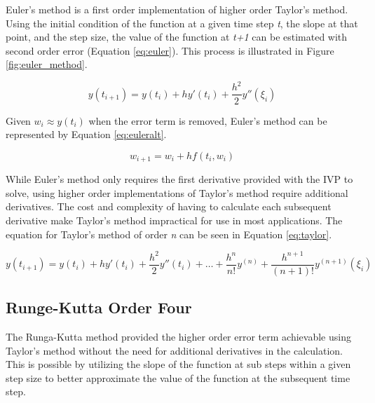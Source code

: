 \documentclass{article}
\begin{document}
Euler's method is a first order implementation of higher order Taylor's method. Using the initial condition of the function at a given time step \textit{t}, the slope at that point, and the step size, the value of the function at \textit{t+1} can be estimated with second order error (Equation \ref{eq:euler}). This process is illustrated in Figure \ref{fig:euler_method}.

\begin{center}
	\begin{equation}
	y(t_{i+1}) = y(t_i) + hy'(t_i)+\frac{h^2}{2}y''(\xi_i) 
	\label{eq:euler}
	\end{equation}
\end{center}

Given $w_i \approx y(t_i)$ when the error term is removed, Euler's method can be represented by Equation \ref{eq:euleralt}.

\begin{center}
	\begin{equation}
	w_{i+1} = w_i + hf(t_i, w_i)
	\label{eq:euleralt}
	\end{equation}
\end{center}


While Euler's method only requires the first derivative provided with the IVP to solve, using higher order implementations of Taylor's method require additional derivatives. The cost and complexity of having to calculate each subsequent derivative make Taylor's method impractical for use in most applications. The equation for Taylor's method of order \textit{n} can be seen in Equation \ref{eq:taylor}.

\begin{center}
	\begin{equation}
	y(t_{i+1}) = y(t_i) + hy'(t_i)+\frac{h^2}{2}y''(t_i) + \dots + \frac{h^n}{n!}y^{(n)} + \frac{h^{n+1}}{(n+1)!}y^{(n+1)}(\xi_i) 
	\label{eq:taylor}
	\end{equation}
\end{center}


\subsection{Runge-Kutta Order Four}
\label{method:rk}


The Runga-Kutta method provided the higher order error term achievable using Taylor's method without the need for additional derivatives in the calculation. This is possible by utilizing the slope of the function at sub steps within a given step size to better approximate the value of the function at the subsequent time step.
\end{document}
